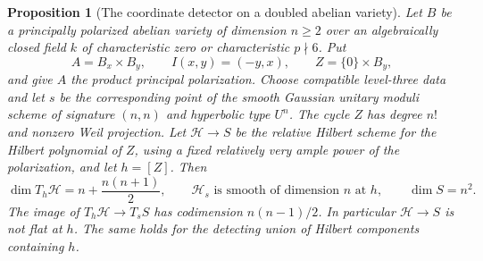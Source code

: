 \documentclass[11pt]{article}
\newtheorem{proposition}[theorem]{Proposition}
\theoremstyle{definition}
\theoremstyle{remark}
\begin{document}
\begin{proposition}[The coordinate detector on a doubled abelian variety]
\label{prop:doubling-nonflat}
Let $B$ be a principally polarized abelian variety of dimension
$n\geq2$ over an algebraically closed field $k$ of characteristic
zero or characteristic $p\nmid6$.  Put
\[
 A=B_x\times B_y,\qquad I(x,y)=(-y,x),
 \qquad Z=\{0\}\times B_y,
\]
and give $A$ the product principal polarization.
Choose compatible level-three data and let $s$ be the
corresponding point of the smooth Gaussian unitary moduli
scheme of signature $(n,n)$ and hyperbolic type $U^n$.
The cycle $Z$ has degree $n!$ and nonzero Weil projection.
Let $\mathscr H\to S$ be the relative Hilbert scheme for the
Hilbert polynomial of $Z$, using a fixed relatively very ample
power of the polarization, and let $h=[Z]$.
Then
\[
 \dim T_h\mathscr H=n+\frac{n(n+1)}2,
 \qquad
 \mathscr H_s\text{ is smooth of dimension }n\text{ at }h,
 \qquad \dim S=n^2.
\]
The image of $T_h\mathscr H\to T_sS$ has codimension
$n(n-1)/2$.  In particular $\mathscr H\to S$ is not flat at
$h$.  The same holds for the detecting union of Hilbert
components containing $h$.
\end{proposition}
\end{document}
